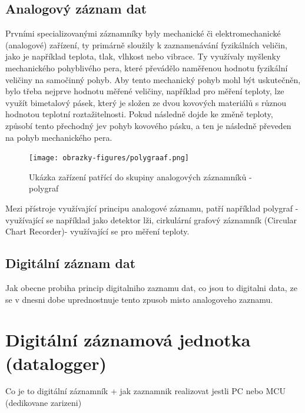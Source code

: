   
\subsection{Analogový záznam dat} %
\label{moznosti_zaznamu_dat}
Prvními specializovanými záznamníky byly mechanické či elektromechanické (analogové) zařízení, ty primárně sloužily k zaznamenávání fyzikálních veličin, jako 
je například teplota, tlak, vlhkost nebo vibrace. Ty využívaly myšlenky mechanického pohyblivého pera, které převádělo naměřenou hodnotu fyzikální veličiny 
na samočinný pohyb. Aby tento mechanický pohyb mohl být uskutečněn, bylo třeba nejprve hodnotu měřené veličiny, například pro měření teploty, lze využít 
bimetalový pásek, který je složen ze dvou kovových materiálů s různou hodnotou teplotní roztažitelnosti. Pokud následně dojde ke změně teploty, způsobí tento 
přechodný jev pohyb kovového pásku, a ten je následně převeden na pohyb mechanického pera.


\begin{figure}[h] %
    \centering
    \texttt{[image: obrazky-figures/polygraaf.png]}
    \caption{Ukázka zařízení patřící do skupiny analogových záznamníků - polygraf \cite{polygraph_picture}}
    \label{fig:polygraaf}
\end{figure}

Mezi přístroje využívající principu analogové záznamu, patří například polygraf - využívající se například jako detektor lži, cirkulární grafový záznamník 
(Circular Chart Recorder)- využívající se pro měření teploty.

\subsection{Digitální záznam dat}
\label{moznosti_zaznamu_dat}
Jak obecne probiha princip digitalniho zaznamu dat, co jsou to digitalni data, ze se v dnesni dobe uprednostnuje tento zpusob misto analogoveho zaznamu.


\section{Digitální záznamová jednotka (datalogger)}
\label{digitalni_zaznamnik}
Co je to digitální záznamník + jak zaznamnik realizovat jestli PC nebo MCU (dedikovane zarizeni)

